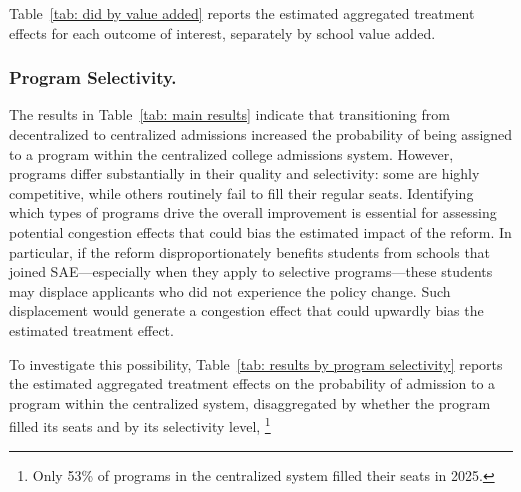 

\noindent Table~\ref{tab: did by value added} reports the estimated aggregated treatment effects for each outcome of interest, separately by school value added. 

\subsubsection{Program Selectivity.} 
The results in Table~\ref{tab: main results} indicate that transitioning from decentralized to centralized admissions increased the probability of being assigned to a program within the centralized college admissions system. However, programs differ substantially in their quality and selectivity: some are highly competitive, while others routinely fail to fill their regular seats. Identifying which types of programs drive the overall improvement is essential for assessing potential congestion effects that could bias the estimated impact of the reform. In particular, if the reform disproportionately benefits students from schools that joined SAE---especially when they apply to selective programs---these students may displace applicants who did not experience the policy change. Such displacement would generate a congestion effect that could upwardly bias the estimated treatment effect.

To investigate this possibility, Table~\ref{tab: results by program selectivity} reports the estimated aggregated treatment effects on the probability of admission to a program within the centralized system, disaggregated by whether the program filled its seats and by its selectivity level, \footnote{Only 53\% of programs in the centralized system filled their seats in 2025.}

